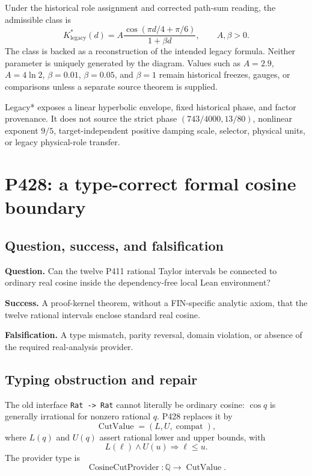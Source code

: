 \documentclass[11pt,a4paper]{article}
\newcommand{\Kstar}{K^*_{\mathrm{legacy}}}
\begin{document}
Under the historical role assignment and corrected path-sum reading, the
admissible class is
\[
\boxed{\Kstar(d)=A\frac{\cos(\pi d/4+\pi/6)}{1+\beta d}},
\qquad A,\beta>0.
\]
The class is backed as a reconstruction of the intended legacy formula.
Neither parameter is uniquely generated by the diagram. Values such as
$A=2.9$, $A=4\ln2$, $\beta=0.01$, $\beta=0.05$, and $\beta=1$ remain
historical freezes, gauges, or comparisons unless a separate source theorem
is supplied.

Legacy* exposes a linear hyperbolic envelope, fixed historical phase, and
factor provenance. It does not source the strict phase $(743/4000,13/80)$,
nonlinear exponent $9/5$, target-independent positive damping scale, selector,
physical units, or legacy physical-role transfer.

\section{P428: a type-correct formal cosine boundary}

\subsection{Question, success, and falsification}

\textbf{Question.} Can the twelve P411 rational Taylor intervals be connected
to ordinary real cosine inside the dependency-free local Lean environment?

\textbf{Success.} A proof-kernel theorem, without a FIN-specific analytic
axiom, that the twelve rational intervals enclose standard real cosine.

\textbf{Falsification.} A type mismatch, parity reversal, domain violation,
or absence of the required real-analysis provider.

\subsection{Typing obstruction and repair}

The old interface \texttt{Rat -> Rat} cannot literally be ordinary cosine:
$\cos q$ is generally irrational for nonzero rational $q$. P428 replaces it
by
\[
\operatorname{CutValue}=(L,U,\operatorname{compat}),
\]
where $L(q)$ and $U(q)$ assert rational lower and upper bounds, with
\[
L(\ell)\wedge U(u)\Longrightarrow \ell\le u.
\]
The provider type is
\[
\operatorname{CosineCutProvider}:\mathbb Q\to\operatorname{CutValue}.
\]
\end{document}
